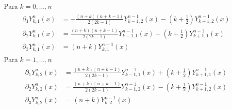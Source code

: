 \begin{prop} Para $k=0,...,n$
	\begin{gather*} 
		\begin{aligned}
			\partial_1Y^{n}_{k,1}(x) &= -\frac{(n+k)(n+k-1)}{2(2k-1)}Y^{n-1}_{k-1,2}(x)-(k+\frac{1}{2})Y^{n-1}_ {k+1,2}(x) \\
		\partial_2Y^{n}_{k,1}(x) &= \frac{(n+k)(n+k-1)}{2(2k-1)}Y^{n-1}_{k-1,1}(x)-(k+\frac{1}{2})Y^{n-1}_ {k+1,1}(x) \\
		\partial_3 Y_{k,1}^{n}(x) &=(n+k)Y_{k,1}^{n-1}(x)
			\end{aligned}
	\end{gather*}
 Para $k=1,...,n$
	\begin{gather*}
	\begin{aligned}
	\partial_1Y^{n}_{k,2}(x) &= \frac{(n+k)(n+k-1)}{2(2k-1)}Y^{n-1}_{k-1,1}(x)+(k+\frac{1}{2})Y^{n-1}_ {k+1,1}(x)\\
	\partial_2Y^{n}_{k,2}(x) &= \frac{(n+k)(n+k-1)}{2(2k-1)}Y^{n-1}_{k-1,2}(x)-(k+\frac{1}{2})Y^{n-1}_ {k+1,2}(x)\\
	\partial_3 Y_{k,2}^{n}(x) &=(n+k)Y_{k,2}^{n-1}(x)
		\end{aligned}
	\end{gather*}
\end{prop}
